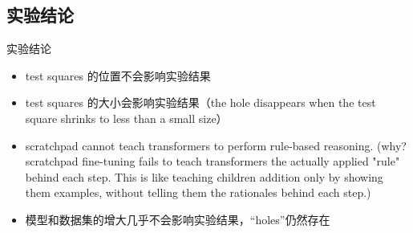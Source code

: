 \subsection{实验结论}
\begin{frame}{实验结论}
	\begin{itemize}
		\item test squares 的位置不会影响实验结果
		      \pause
		\item test squares 的大小会影响实验结果（the hole disappears when the test square shrinks to less than a small size）
		      \pause
		\item scratchpad cannot teach transformers to perform rule-based reasoning. (why? scratchpad fine-tuning fails to teach transformers the actually applied "rule" behind each step. This is like teaching children addition only by showing them examples, without telling them the rationales behind each step.)
		      \pause
		\item 模型和数据集的增大几乎不会影响实验结果，“holes”仍然存在
	\end{itemize}
\end{frame}
